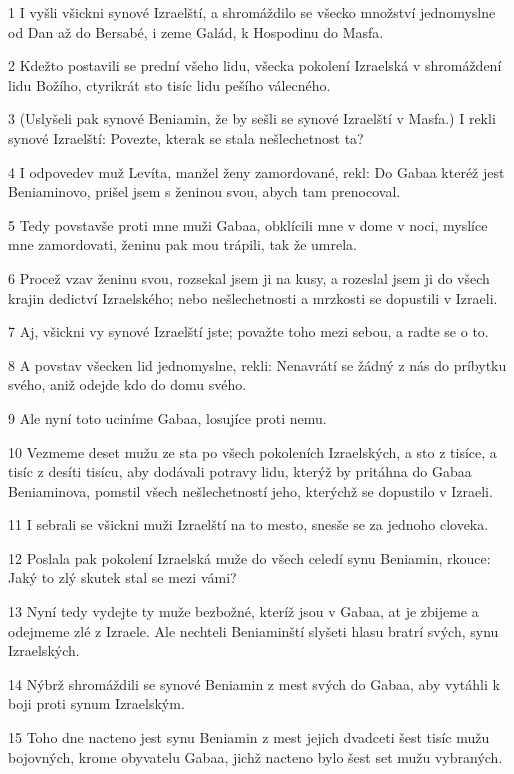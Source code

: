 \par 1 I vyšli všickni synové Izraelští, a shromáždilo se všecko množství jednomyslne od Dan až do Bersabé, i zeme Galád, k Hospodinu do Masfa.
\par 2 Kdežto postavili se prední všeho lidu, všecka pokolení Izraelská v shromáždení lidu Božího, ctyrikrát sto tisíc lidu pešího válecného.
\par 3 (Uslyšeli pak synové Beniamin, že by sešli se synové Izraelští v Masfa.) I rekli synové Izraelští: Povezte, kterak se stala nešlechetnost ta?
\par 4 I odpovedev muž Levíta, manžel ženy zamordované, rekl: Do Gabaa kteréž jest Beniaminovo, prišel jsem s ženinou svou, abych tam prenocoval.
\par 5 Tedy povstavše proti mne muži Gabaa, obklícili mne v dome v noci, myslíce mne zamordovati, ženinu pak mou trápili, tak že umrela.
\par 6 Procež vzav ženinu svou, rozsekal jsem ji na kusy, a rozeslal jsem ji do všech krajin dedictví Izraelského; nebo nešlechetnosti a mrzkosti se dopustili v Izraeli.
\par 7 Aj, všickni vy synové Izraelští jste; považte toho mezi sebou, a radte se o to.
\par 8 A povstav všecken lid jednomyslne, rekli: Nenavrátí se žádný z nás do príbytku svého, aniž odejde kdo do domu svého.
\par 9 Ale nyní toto uciníme Gabaa, losujíce proti nemu.
\par 10 Vezmeme deset mužu ze sta po všech pokoleních Izraelských, a sto z tisíce, a tisíc z desíti tisícu, aby dodávali potravy lidu, kterýž by pritáhna do Gabaa Beniaminova, pomstil všech nešlechetností jeho, kterýchž se dopustilo v Izraeli.
\par 11 I sebrali se všickni muži Izraelští na to mesto, snesše se za jednoho cloveka.
\par 12 Poslala pak pokolení Izraelská muže do všech celedí synu Beniamin, rkouce: Jaký to zlý skutek stal se mezi vámi?
\par 13 Nyní tedy vydejte ty muže bezbožné, kteríž jsou v Gabaa, at je zbijeme a odejmeme zlé z Izraele. Ale nechteli Beniaminští slyšeti hlasu bratrí svých, synu Izraelských.
\par 14 Nýbrž shromáždili se synové Beniamin z mest svých do Gabaa, aby vytáhli k boji proti synum Izraelským.
\par 15 Toho dne nacteno jest synu Beniamin z mest jejich dvadceti šest tisíc mužu bojovných, krome obyvatelu Gabaa, jichž nacteno bylo šest set mužu vybraných.
